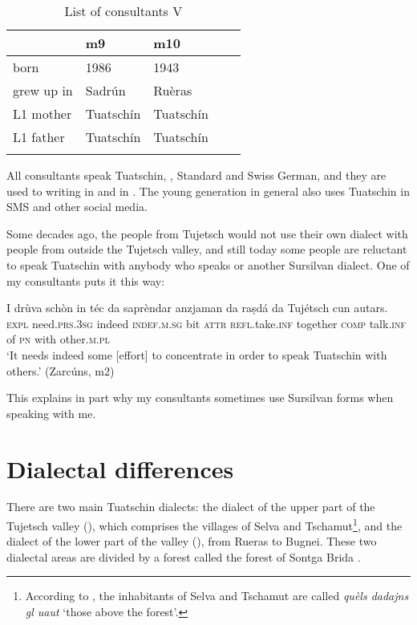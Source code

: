 \begin{table}
	\caption{List of consultants V}
	\label{tab:consultantsV}
	\begin{tabular}{lllll}
		\lsptoprule
		& m9 & m10\\
		\midrule
		born   & 1986 & 1943\\
		grew up in   &  Sadrún & Ruèras \\
		L1 mother & Tuatschín & Tuatschín\\
		L1 father  & Tuatschín & Tuatschín\\
		\lspbottomrule
		\end{tabular}
\end{table}

All consultants speak Tuatschin, , Standard and Swiss German, and they are used to writing in  and in . The young generation in general also uses Tuatschin in SMS and other social media.

Some decades ago, the people from Tujetsch would not use their own dialect with people from outside the Tujetsch valley, and still today some people are reluctant to speak Tuatschin with anybody who speaks  or another Sursilvan dialect. One of my consultants puts it this way:

\ea

\gll I drùva schòn in téc da saprèndar anzjaman da raṣdá da Tujétsch cun autars.\\
\textsc{expl} need.\textsc{prs.3sg} indeed \textsc{indef.m.sg} bit \textsc{attr} \textsc{refl}.take.\textsc{inf} together \textsc{comp} talk.\textsc{inf} of \textsc{pn} with other.\textsc{m.pl}\\
\glt `It needs indeed some [effort] to concentrate in order to speak Tuatschin with others.' (Zarcúns, m2)
\z

This explains in part why my consultants sometimes use Sursilvan forms when speaking with me.

\section{Dialectal differences}\label{sec:1.3}
There are two main Tuatschin dialects: the dialect of the upper part of the Tujetsch valley (), which comprises the villages of Selva and Tschamut\footnote{According to , the inhabitants of Selva and Tschamut are called \textit{quèls dadajns gl uaut} `those above the forest'.}, and the dialect of the lower part of the valley (), from Rueras to Bugnei. These two dialectal areas are divided by a forest called the forest of Sontga Brida \citep[3]{Caduff1952}. 

